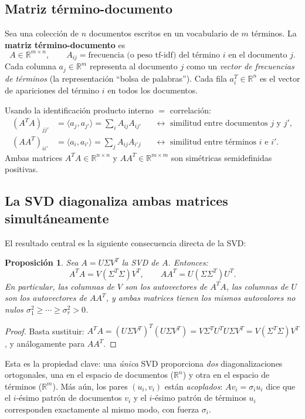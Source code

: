 \documentclass[12pt]{article}
\newtheorem{proposition}[theorem]{Proposición}
\newcommand{\R}{\mathbb{R}}
\begin{document}
\subsection{Matriz término-documento}

Sea una colección de $n$ documentos escritos en un vocabulario de $m$ términos. La \textbf{matriz término-documento} es
\[
  A \in \R^{m \times n}, \qquad A_{ij} = \text{frecuencia (o peso tf-idf) del término } i \text{ en el documento } j.
\]
Cada columna $a_j \in \R^m$ representa al documento $j$ como un \emph{vector de frecuencias de términos} (la representación ``bolsa de palabras''). Cada fila $a_i^T \in \R^n$ es el vector de apariciones del término $i$ en todos los documentos.

Usando la identificación producto interno $=$ correlación:
\begin{align*}
  (A^T A)_{jj'} &= \langle a_j, a_{j'} \rangle = \sum_i A_{ij} A_{ij'} &&\longleftrightarrow \text{ similitud entre documentos } j \text{ y } j',\\
  (A A^T)_{ii'} &= \langle a_i, a_{i'} \rangle = \sum_j A_{ij} A_{i'j} &&\longleftrightarrow \text{ similitud entre términos } i \text{ e } i'.
\end{align*}
Ambas matrices $A^TA \in \R^{n\times n}$ y $AA^T \in \R^{m\times m}$ son simétricas semidefinidas positivas.

\subsection{La SVD diagonaliza ambas matrices simultáneamente}

El resultado central es la siguiente consecuencia directa de la SVD:

\begin{proposition}
Sea $A = U\Sigma V^T$ la SVD de $A$. Entonces:
\[
  A^T A = V (\Sigma^T \Sigma) V^T, \qquad A A^T = U (\Sigma \Sigma^T) U^T.
\]
En particular, las columnas de $V$ son los autovectores de $A^TA$, las columnas de $U$ son los autovectores de $AA^T$, y ambas matrices tienen los mismos autovalores no nulos $\sigma_1^2 \geq \cdots \geq \sigma_r^2 > 0$.
\end{proposition}
\begin{proof}
Basta sustituir: $A^TA = (U\Sigma V^T)^T(U\Sigma V^T) = V\Sigma^T U^T U \Sigma V^T = V(\Sigma^T\Sigma)V^T$, y análogamente para $AA^T$.
\end{proof}

Esta es la propiedad clave: una \emph{única} SVD proporciona \emph{dos} diagonalizaciones ortogonales, una en el espacio de documentos ($\R^n$) y otra en el espacio de términos ($\R^m$). Más aún, los pares $(u_i, v_i)$ están \emph{acoplados}: $Av_i = \sigma_i u_i$ dice que el $i$-ésimo patrón de documentos $v_i$ y el $i$-ésimo patrón de términos $u_i$ corresponden exactamente al mismo modo, con fuerza $\sigma_i$.
\end{document}
